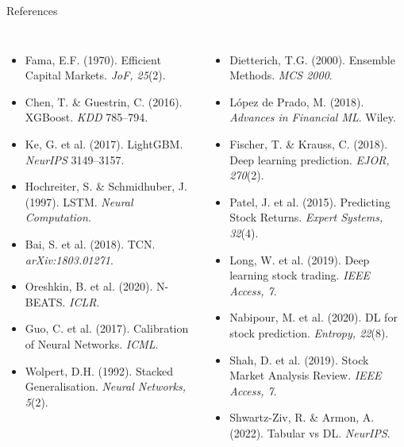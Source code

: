 \documentclass[10pt,aspectratio=43]{beamer}
\begin{document}
\begin{frame}{References}
  \vspace{-0.4cm}
  \begin{columns}[T]
      \scriptsize
      \begin{itemize}\itemsep1pt
        \item Fama, E.F. (1970). Efficient Capital Markets. \textit{JoF, 25}(2).
        \item Chen, T. \& Guestrin, C. (2016). XGBoost. \textit{KDD} 785--794.
        \item Ke, G. et al. (2017). LightGBM. \textit{NeurIPS} 3149--3157.
        \item Hochreiter, S. \& Schmidhuber, J. (1997). LSTM. \textit{Neural Computation}.
        \item Bai, S. et al. (2018). TCN. \textit{arXiv:1803.01271}.
        \item Oreshkin, B. et al. (2020). N-BEATS. \textit{ICLR}.
        \item Guo, C. et al. (2017). Calibration of Neural Networks. \textit{ICML}.
        \item Wolpert, D.H. (1992). Stacked Generalisation. \textit{Neural Networks, 5}(2).
      \end{itemize}
      \scriptsize
      \begin{itemize}\itemsep1pt
        \item Dietterich, T.G. (2000). Ensemble Methods. \textit{MCS 2000}.
        \item L\'opez de Prado, M. (2018). \textit{Advances in Financial ML}. Wiley.
        \item Fischer, T. \& Krauss, C. (2018). Deep learning prediction. \textit{EJOR, 270}(2).
        \item Patel, J. et al. (2015). Predicting Stock Returns. \textit{Expert Systems, 32}(4).
        \item Long, W. et al. (2019). Deep learning stock trading. \textit{IEEE Access, 7}.
        \item Nabipour, M. et al. (2020). DL for stock prediction. \textit{Entropy, 22}(8).
        \item Shah, D. et al. (2019). Stock Market Analysis Review. \textit{IEEE Access, 7}.
        \item Shwartz-Ziv, R. \& Armon, A. (2022). Tabular vs DL. \textit{NeurIPS}.
      \end{itemize}
  \end{columns}
\end{frame}
\end{document}
